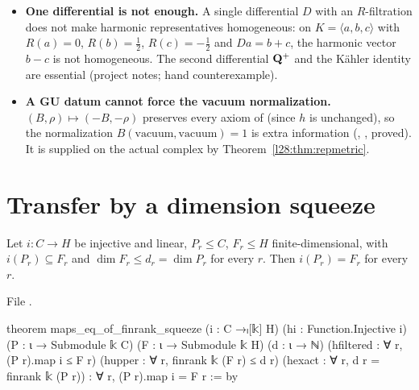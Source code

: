 \begin{warning}[title={Dead ends in the abstract Hodge theory}]\label{l28:warn:signtwist}
\begin{itemize}
\item \textbf{One differential is not enough.} A single differential $D$ with an $R$-filtration does not make harmonic representatives
  homogeneous: on $K=\langle a,b,c\rangle$ with $R(a)=0$, $R(b)=\tfrac12$, $R(c)=-\tfrac12$ and $Da=b+c$, the harmonic vector $b-c$ is not
  homogeneous. The second differential $\mathbf Q^+$ and the Kähler identity are essential (project notes; hand counterexample).
\item \textbf{A GU datum cannot force the vacuum normalization.} $(B,\rho)\mapsto(-B,-\rho)$ preserves every axiom of  (since
  $h$ is unchanged), so the normalization $B(\text{vacuum},\text{vacuum})=1$ is extra information
  (, , proved). It is supplied on the actual
  complex by Theorem~\ref{l28:thm:repmetric}.
\end{itemize}
\end{warning}

\section{Transfer by a dimension squeeze}\label{l28:sec:squeeze}

\begin{theorem}\label{l28:thm:squeeze}
Let $i:C\to H$ be injective and linear, $P_r\le C$, $F_r\le H$ finite-dimensional, with $i(P_r)\subseteq F_r$ and $\dim F_r\le d_r=\dim P_r$ for
every $r$. Then $i(P_r)=F_r$ for every $r$.
\end{theorem}

\noindent File .
\begin{leancode}
theorem maps_eq_of_finrank_squeeze
    (i : C →ₗ[𝕜] H) (hi : Function.Injective i)
    (P : ι → Submodule 𝕜 C) (F : ι → Submodule 𝕜 H) (d : ι → ℕ)
    (hfiltered : ∀ r, (P r).map i ≤ F r)
    (hupper : ∀ r, finrank 𝕜 (F r) ≤ d r)
    (hexact : ∀ r, d r = finrank 𝕜 (P r)) : ∀ r, (P r).map i = F r := by
\end{leancode}

